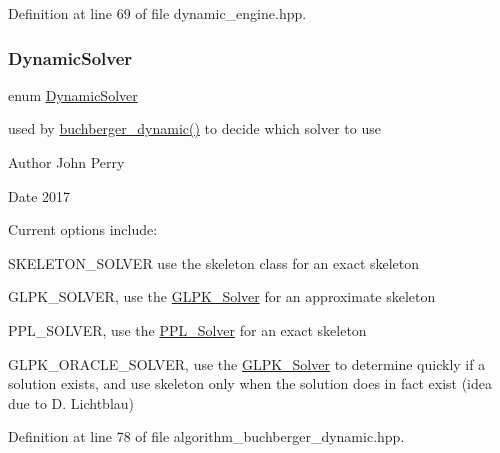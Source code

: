 Definition at line 69 of file dynamic\+\_\+engine.\+hpp.

\mbox{\label{group___g_b_computation_ga28fbbb9eb7d8b80ced05c8fa89b2bdac}} 
\subsubsection{\texorpdfstring{Dynamic\+Solver}{DynamicSolver}}
{\footnotesize\ttfamily enum \hyperlink{group___g_b_computation_ga28fbbb9eb7d8b80ced05c8fa89b2bdac}{Dynamic\+Solver}}



used by \hyperlink{group___g_b_computation_ga40140d94eac91d7337f553d362128cb7}{buchberger\+\_\+dynamic()} to decide which solver to use 

\begin{DoxyAuthor}{Author}
John Perry 
\end{DoxyAuthor}
\begin{DoxyDate}{Date}
2017
\end{DoxyDate}
Current options include\+:
\begin{DoxyItemize}
\item S\+K\+E\+L\+E\+T\+O\+N\+\_\+\+S\+O\+L\+V\+ER use the skeleton class for an exact skeleton
\item G\+L\+P\+K\+\_\+\+S\+O\+L\+V\+ER, use the \hyperlink{group___c_l_s_solvers_class_g_l_p_k___solver}{G\+L\+P\+K\+\_\+\+Solver} for an approximate skeleton
\item P\+P\+L\+\_\+\+S\+O\+L\+V\+ER, use the \hyperlink{group___c_l_s_solvers_class_p_p_l___solver}{P\+P\+L\+\_\+\+Solver} for an exact skeleton
\item G\+L\+P\+K\+\_\+\+O\+R\+A\+C\+L\+E\+\_\+\+S\+O\+L\+V\+ER, use the \hyperlink{group___c_l_s_solvers_class_g_l_p_k___solver}{G\+L\+P\+K\+\_\+\+Solver} to determine quickly if a solution exists, and use skeleton only when the solution does in fact exist (idea due to D. Lichtblau) 
\end{DoxyItemize}

Definition at line 78 of file algorithm\+\_\+buchberger\+\_\+dynamic.\+hpp.

\mbox{\label{group___g_b_computation_ga73257b8a2d5cc826853a71b77d0cebf2}} 
